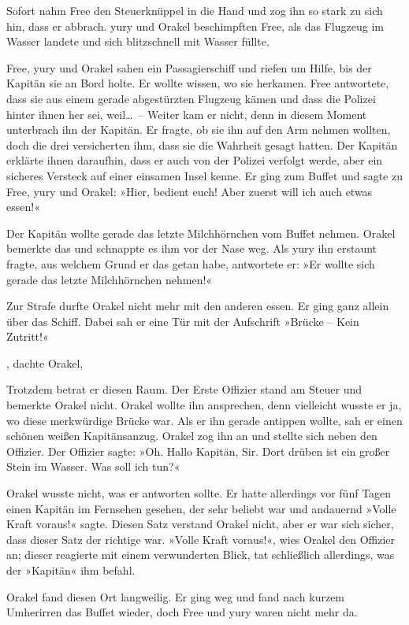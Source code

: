 Sofort nahm Free den Steuerknüppel in die Hand und zog ihn so stark zu sich hin, dass er abbrach. yury und Orakel beschimpften Free, als das Flugzeug im Wasser landete und sich blitzschnell mit Wasser füllte.

Free, yury und Orakel sahen ein Passagierschiff und riefen um Hilfe, bis der Kapitän sie an Bord holte. Er wollte wissen, wo sie herkamen. Free antwortete, dass sie aus einem gerade abgestürzten Flugzeug kämen und dass die Polizei hinter ihnen her sei, weil…~– Weiter kam er nicht, denn in diesem Moment unterbrach ihn der Kapitän. Er fragte, ob sie ihn auf den Arm nehmen wollten, doch die drei versicherten ihm, dass sie die Wahrheit gesagt hatten. Der Kapitän erklärte ihnen daraufhin, dass er auch von der Polizei verfolgt werde, aber ein sicheres Versteck auf einer einsamen Insel kenne. Er ging zum Buffet und sagte zu Free, yury und Orakel: »Hier, bedient euch! Aber zuerst will ich auch etwas essen!«

Der Kapitän wollte gerade das letzte Milchhörnchen vom Buffet nehmen. Orakel bemerkte das und schnappte es ihm vor der Nase weg. Als yury ihn erstaunt fragte, aus welchem Grund er das getan habe, antwortete er: »Er wollte sich gerade das letzte Milchhörnchen nehmen!«

Zur Strafe durfte Orakel nicht mehr mit den anderen essen. Er ging ganz allein über das Schiff. Dabei sah er eine Tür mit der Aufschrift »Brücke – Kein Zutritt!«

, dachte Orakel, 

Trotzdem betrat er diesen Raum. Der Erste Offizier stand am Steuer und bemerkte Orakel nicht. Orakel wollte ihn ansprechen, denn vielleicht wusste er ja, wo diese merkwürdige Brücke war. Als er ihn gerade antippen wollte, sah er einen schönen weißen Kapitänsanzug. Orakel zog ihn an und stellte sich neben den Offizier. Der Offizier sagte: »Oh. Hallo Kapitän, Sir. Dort drüben ist ein großer Stein im Wasser. Was soll ich tun?«

Orakel wusste nicht, was er antworten sollte. Er hatte allerdings vor fünf Tagen einen Kapitän im Fernsehen gesehen, der sehr beliebt war und andauernd »Volle Kraft voraus!« sagte. Diesen Satz verstand Orakel nicht, aber er war sich sicher, dass dieser Satz der richtige war. »Volle Kraft voraus!«, wies Orakel den Offizier an; dieser reagierte mit einem verwunderten Blick, tat schließlich allerdings, was der »Kapitän« ihm befahl.

Orakel fand diesen Ort langweilig. Er ging weg und fand nach kurzem Umherirren das Buffet wieder, doch Free und yury waren nicht mehr da.


